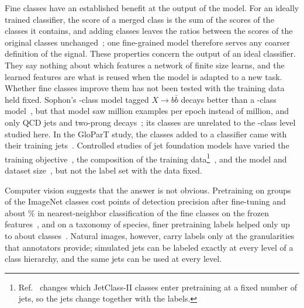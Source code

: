 \documentclass[11pt]{article}
\newcommand{\Kfull}{\VocabSizeLoneeighteight}
\newcommand{\Kmid}{\VocabSizeRfourtwoQone}
\begin{document}
Fine classes have an established benefit at the output of the model. For an ideally trained
classifier, the score of a merged class is the sum of the scores of the classes it contains, and
adding classes leaves the ratios between the scores of the original classes
unchanged~\cite[Properties~1--2, Eqs.~(2)--(3)]{sophon}; one fine-grained model therefore serves any
coarser definition of the signal. These properties concern the output of an ideal classifier. They
say nothing about which features a network of finite size learns, and the learned features are
what is reused when the model is adapted to a new task. Whether fine classes improve them has not
been tested with the training data held fixed. Sophon's \Kfull-class model tagged $X\to b\bar b$
decays better than a \LitSophonAblationNClasses-class model~\cite[Sec.~III]{sophon}, but that model
saw \LitSophonSubsetSamplesPerEpochMillion{} million examples per epoch instead of \LitSophonSamplesPerEpochMillion{} million, and only QCD jets and
two-prong decays~\cite[App.~B.2]{sophon};
its \LitSophonAblationNClasses{} classes are unrelated to the \Kmid-class level studied here. In the
GloParT study, the classes added to a classifier came with their training
jets~\cite[Sec.~11.4.1]{glopart}. Controlled studies of jet foundation models have varied the
training objective~\cite{objectives,rieck,reprlearn}, the composition of the training
data\footnote{Ref.~\cite{datacomp} changes which JetClass-II classes enter pretraining at a fixed
number of jets, so the jets change together with the labels.}~\cite{datacomp}, and the model and
dataset size~\cite{scaling,viglscaling}, but not the label set with the data fixed.

Computer vision suggests that the answer is not obvious. Pretraining on \LitHuhCoarseClasses{}
groups of the \LitHuhFineClasses{} ImageNet classes cost \LitHuhPascalDropMap{} points of
detection precision after fine-tuning and about \LitHuhKnnGapPercent\% in nearest-neighbor
classification of the fine classes on the frozen features~\cite{huh}, and on a taxonomy of species,
finer pretraining labels helped only up to about \LitHongDeclineClasses{} classes~\cite{hong}.
Natural images, however, carry labels only at the granularities that annotators provide; simulated
jets can be labeled exactly at every level of a class hierarchy, and the same jets can be used at
every level.
\end{document}
